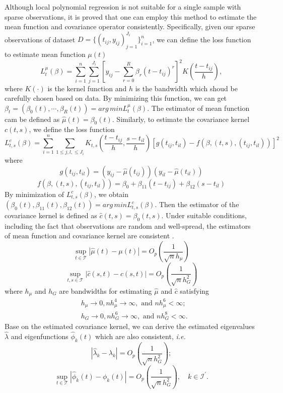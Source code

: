 \documentclass{article}
\begin{document}
Although local polynomial regression is not suitable for a single sample with sparse observations, 
it is proved that one can employ this method to estimate the mean function and covariance operator consistently.
Specifically, given our sparse observations of dataset $D=\{(t_{ij},y_{ij})_{j=1}^{J_i}\}_{i=1}^n
$,
we can define the loss function to estimate mean function $\mu(t)$
$$
L_t^\mu(\beta)=\sum_{i=1}^n\sum_{j=1}^{J_i}\left[y_{ij}-\sum_{r=0}^R \beta_r\left(t-t_{ij}\right)^r\right]^2 K\left(\frac{t-t_{ij}}{h}\right),
$$
where $K(\cdot)$ is the kernel function and $h$ is the bandwidth which shoud be carefully chosen based on data.
By minimizing this function, we can get
$\beta_t=(\beta_0(t), \cdots, \beta_R(t))=arg\,min L_t^\mu(\beta)$. The estimator of mean function cam be defined as $\hat{\mu}(t)=\beta_0(t)$.
Similarly, to estimate the covariance kernel $c(t,s)$, we define the loss function 
$$
L^c_{t,s}(\beta)=\sum_{i=1}^n \sum_{1\leq j, l, \leq J_i} K_{t,s}(\frac{t-t_{ij}}{h}, \frac{s-t_{il}}{h}) \left[ g(t_{ij},t_{il})-f\left(\beta,(t,s),(t_{ij},t_{il})\right) \right]^2
$$
where
$$
g(t_{ij},t_{il})=(y_{ij}-\hat{\mu}(t_{ij}))(y_{il}-\hat{\mu}(t_{il}))
$$
$$
f\left(\beta,(t,s),(t_{ij},t_{il})\right)=\beta_0 + \beta_{11}(t-t_{ij})+\beta_{12}(s-t_{il})
$$
By minimization of $L_{t,s}^c(\beta)$, we obtain $(\beta_0(t),\beta_{11}(t),\beta_{12}(t))=arg\,min L_{t,s}^c(\beta)$. Then the estimator of the covariance kernel is defined as $\hat{c}(t,s)=\beta_0(t,s)$.
Under suitable conditions, including the fact that observations are random and well-spread, the estimators of mean function and covariance kernel are consistent \cite{yao2005functional} .
$$
\sup _{t \in \mathcal{T}}|\hat{\mu}(t)-\mu(t)|=O_p\left(\frac{1}{\sqrt{n} h_\mu}\right)
$$
$$
\sup _{t, s \in \mathcal{T}}|\hat{c}(s, t)-c(s, t)|=O_p\left(\frac{1}{\sqrt{n} h_G^2}\right)
$$
where $h_\mu$ and $h_G$ are bandwidths for estimating $\hat \mu$ and $\hat c$ satisfying
$$
\begin{aligned}
& h_\mu \rightarrow 0, n h_\mu^4 \rightarrow \infty, \text { and } n h_\mu^6<\infty; \\
& h_G \rightarrow 0, n h_G^6 \rightarrow \infty, \text { and } n h_G^8<\infty.
\end{aligned}
$$
Base on the estimated covariance kernel, we can derive the estimated  eigenvalues $\hat \lambda$ and eigenfunctions $\hat{\phi}_k(t)$ which are also consistent, \textit{i.e.}
$$
\left|\hat{\lambda}_k-\lambda_k\right|=O_p\left(\frac{1}{\sqrt{n} h_G^2}\right);
$$
$$
\sup _{t \in \mathcal{T}}\left|\hat{\phi}_k(t)-\phi_k(t)\right|=O_p\left(\frac{1}{\sqrt{n} h_G^2}\right), \quad k \in \mathcal{I}^{\prime}.
$$
\end{document}

